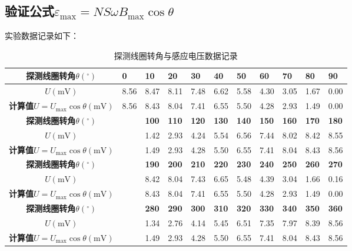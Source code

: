 \documentclass[UTF-8,twoside,cs4size]{ctexart}
\begin{document}
	\subsection{验证公式$ \varepsilon_\max=NS\omega B_\max\cos\theta $}
	实验数据记录如下：
	\begin{table}[!h]		
		\centering
		\renewcommand\arraystretch{1.5}
		\caption{探测线圈转角与感应电压数据记录}
		\small
		\begin{tabularx}{\textwidth}{|c|Y|Y|Y|Y|Y|Y|Y|Y|Y|Y|}
			\hline
			\textbf{探测线圈转角}$ \theta(^\circ) $&\textbf{0}&\textbf{10}&\textbf{20}&\textbf{30}&\textbf{40}&\textbf{50}&\textbf{60}&\textbf{70}&\textbf{80}&\textbf{90}\\
			\hline
			$ U(\mathrm{mV}) $&8.56&8.47&8.11&7.48&6.62&5.58&4.30&3.05&1.67&0.00\\
			\hline
			\textbf{计算值}$ U=U_\max\cos\theta(\mathrm{mV}) $&8.56&8.43&8.04&7.41&6.55&5.50&4.28&2.93&1.49&0.00\\
			\hline
			\textbf{探测线圈转角}$ \theta(^\circ) $&&\textbf{100}&\textbf{110}&\textbf{120}&\textbf{130}&\textbf{140}&\textbf{150}&\textbf{160}&\textbf{170}&\textbf{180}\\
			\hline
			$ U(\mathrm{mV}) $&&1.42&2.93&4.24&5.54&6.56&7.44&8.02&8.42&8.55\\
			\hline
			\textbf{计算值}$ U=U_\max\cos\theta(\mathrm{mV}) $&&1.49&2.93&4.28&5.50&6.55&7.41&8.04&8.43&8.56\\
			\hline
			\textbf{探测线圈转角}$ \theta(^\circ) $&&\textbf{190}&\textbf{200}&\textbf{210}&\textbf{220}&\textbf{230}&\textbf{240}&\textbf{250}&\textbf{260}&\textbf{270}\\
			\hline
			$ U(\mathrm{mV}) $&&8.42&8.04&7.43&6.65&5.48&4.39&3.04&1.66&0.16\\
			\hline
			\textbf{计算值}$ U=U_\max\cos\theta(\mathrm{mV}) $&&8.43&8.04&7.41&6.55&5.50&4.28&2.93&1.49&0.00\\
			\hline
			\textbf{探测线圈转角}$ \theta(^\circ) $&&\textbf{280}&\textbf{290}&\textbf{300}&\textbf{310}&\textbf{320}&\textbf{330}&\textbf{340}&\textbf{350}&\textbf{360}\\
			\hline
			$ U(\mathrm{mV}) $&&1.34&2.76&4.14&5.45&6.51&7.35&7.97&8.39&8.56\\
			\hline
			\textbf{计算值}$ U=U_\max\cos\theta(\mathrm{mV}) $&&1.49&2.93&4.28&5.50&6.55&7.41&8.04&8.43&8.56\\
			\hline
		\end{tabularx}
	\end{table}
\end{document}
